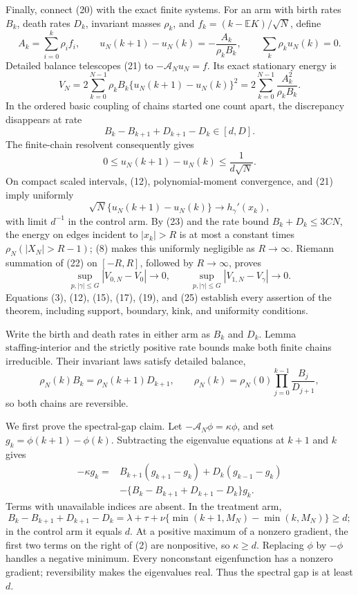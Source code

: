 Finally, connect (20) with the exact finite systems.  For an arm with birth rates \(B_k\), death rates \(D_k\), invariant masses \(\rho_k\), and \(f_k=(k-\mathbb EK)/\sqrt N\), define
\[
 A_k=\sum_{i=0}^k\rho_i f_i,
 \qquad
 u_N(k+1)-u_N(k)=-\frac{A_k}{\rho_kB_k},
 \qquad \sum_k\rho_ku_N(k)=0.                                \tag{21}
\]
Detailed balance telescopes (21) to \(-\mathcal A_Nu_N=f\).  Its exact stationary energy is
\[
 V_N=2\sum_{k=0}^{N-1}\rho_kB_k\{u_N(k+1)-u_N(k)\}^2
 =2\sum_{k=0}^{N-1}\frac{A_k^2}{\rho_kB_k}.                   \tag{22}
\]
In the ordered basic coupling of chains started one count apart, the discrepancy disappears at rate
\[
 B_k-B_{k+1}+D_{k+1}-D_k\in[d,D].
\]
The finite-chain resolvent consequently gives
\[
 0\leq u_N(k+1)-u_N(k)\leq\frac1{d\sqrt N}.                   \tag{23}
\]
On compact scaled intervals, (12), polynomial-moment convergence, and (21) imply uniformly
\[
 \sqrt N\{u_N(k+1)-u_N(k)\}\longrightarrow h_\gamma'(x_k),   \tag{24}
\]
with limit \(d^{-1}\) in the control arm.  By (23) and the rate bound \(B_k+D_k\leq3CN\), the energy on edges incident to \(|x_k|>R\) is at most a constant times \(\rho_N(|X_N|>R-1)\); (8) makes this uniformly negligible as \(R\to\infty\).  Riemann summation of (22) on \([-R,R]\), followed by \(R\to\infty\), proves
\[
 \sup_{p,|\gamma|\leq G}|V_{0,N}-V_0|\to0,
 \qquad
 \sup_{p,|\gamma|\leq G}|V_{1,N}-V_\gamma|\to0.             \tag{25}
\]
Equations (3), (12), (15), (17), (19), and (25) establish every assertion of the theorem, including support, boundary, kink, and uniformity conditions.

Write the birth and death rates in either arm as \(B_k\) and \(D_k\).  Lemma \(\mathrm{staffing\mbox{-}interior}\) and the strictly positive rate bounds make both finite chains irreducible.  Their invariant laws satisfy detailed balance,
\[
 \rho_N(k)B_k=\rho_N(k+1)D_{k+1},
 \qquad
 \rho_N(k)=\rho_N(0)\prod_{j=0}^{k-1}\frac{B_j}{D_{j+1}},    \tag{1}
\]
so both chains are reversible.

We first prove the spectral-gap claim.  Let \(-\mathcal A_N\phi=\kappa\phi\), and set \(g_k=\phi(k+1)-\phi(k)\).  Subtracting the eigenvalue equations at \(k+1\) and \(k\) gives
\[
 \begin{split}
 -\kappa g_k={}&B_{k+1}(g_{k+1}-g_k)+D_k(g_{k-1}-g_k)\\
 &-\{B_k-B_{k+1}+D_{k+1}-D_k\}g_k.                            \tag{2}
 \end{split}
\]
Terms with unavailable indices are absent.  In the treatment arm,
\[
 B_k-B_{k+1}+D_{k+1}-D_k
 =\lambda+\tau+\nu\{\min(k+1,M_N)-\min(k,M_N)\}\geq d;       \tag{3}
\]
in the control arm it equals \(d\).  At a positive maximum of a nonzero gradient, the first two terms on the right of (2) are nonpositive, so \(\kappa\geq d\).  Replacing \(\phi\) by \(-\phi\) handles a negative minimum.  Every nonconstant eigenfunction has a nonzero gradient; reversibility makes the eigenvalues real.  Thus the spectral gap is at least \(d\).


